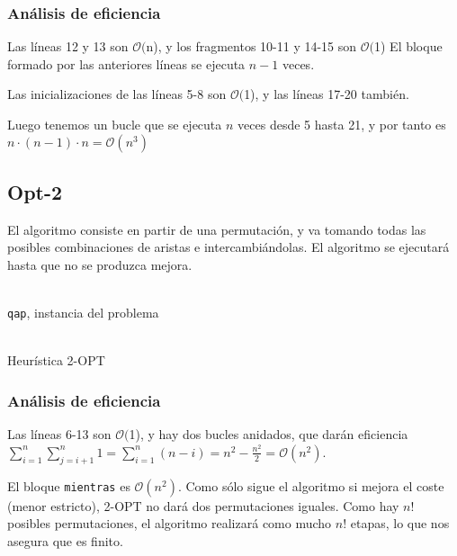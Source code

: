\documentclass[a4paper, 11pt]{article} %
\newcommand{\ef}[1]{$\mathcal{O}#1$}
\begin{document}
\subsubsection{Análisis de eficiencia}
Las líneas 12 y 13 son \ef(n), y los fragmentos 10-11 y 14-15 son \ef(1)
El bloque formado por las anteriores líneas se ejecuta $n-1$ veces.

Las inicializaciones de las líneas 5-8 son \ef(1), y las líneas 17-20 también.

Luego tenemos un bucle que se ejecuta $n$ veces desde 5 hasta 21, y por tanto
es $n\cdot(n-1)\cdot n = \mathcal{O}(n^3)$

\subsection{Opt-2}
El algoritmo consiste en partir de una permutación, y va tomando todas las posibles
combinaciones de aristas e intercambiándolas. El algoritmo se ejecutará
hasta que no se produzca mejora.
\begin{algorithm}[H]
	\begin{algorithmic}[1]
		\REQUIRE \ \\
        	\texttt{qap}, instancia del problema \\\
	      \STATE{\texttt{old\_cost=qap.cost}}
	      \ELSE
	      \ENDIF  
	  \ENDFOR
	\ENDFOR
	\ENDWHILE
	\end{algorithmic}
    \caption{Heurística 2-OPT}
    \label{opt2}
\end{algorithm}  

\subsubsection{Análisis de eficiencia}
Las líneas 6-13 son \ef(1), y hay dos bucles anidados, que darán eficiencia 
$\sum_{i=1}^{n} \sum_{j=i+1}^{n} 1 = \sum_{i=1}^{n} (n-i)= n^2-\frac{n^2}{2}=\mathcal{O}(n^2)$.

El bloque \texttt{mientras} es $\mathcal{O}(n^2)$. Como sólo sigue el algoritmo si mejora el
coste (menor estricto), 2-OPT no dará dos permutaciones iguales. Como hay $n!$ posibles
permutaciones, el algoritmo realizará como mucho $n!$ etapas, lo que nos asegura que es finito.
\end{document}
